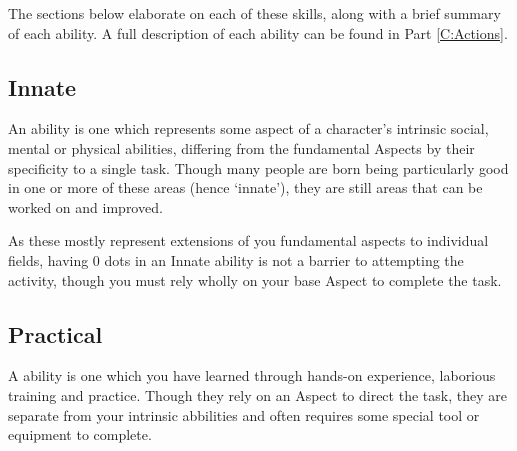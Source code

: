 The sections below elaborate on each of these skills, along with a brief summary of each ability. A full description of each ability can be found in Part \ref{C:Actions}.


\subsection{Innate}

An  ability is one which represents some aspect of a character's intrinsic social, mental or physical abilities, differing from the fundamental Aspects by their specificity to a single task. Though many people are born being particularly good in one or more of these areas (hence `innate'), they are still areas that can be worked on and improved. 

As these mostly represent extensions of you fundamental aspects to individual fields, having 0 dots in an Innate ability is not a barrier to attempting the activity, though you must rely wholly on your base Aspect to complete the task. 

\abilityTable
{
}


\newpage
\subsection{Practical}

A  ability is one which you have learned through hands-on experience, laborious training and practice. Though they rely on an Aspect to direct the task, they are separate from your intrinsic abbilities and often requires some special tool or equipment to complete. 

